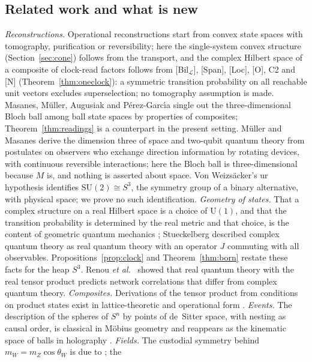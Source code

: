 \documentclass[aps,pra,onecolumn,superscriptaddress,nofootinbib,10pt]{revtex4-2}
\theoremstyle{definition}
\theoremstyle{remark}
\newcommand{\cL}{\mathcal{L}}
\newcommand{\SU}{\mathrm{SU}}
\newcommand{\U}{\mathrm{U}}
\begin{document}
\subsection{Related work and what is new}
\emph{Reconstructions.}  Operational reconstructions \cite{Hardy,CDP,MM,MMAP,DB} start from convex state
spaces with tomography, purification or reversibility; here the single-system convex structure
(Section~\ref{sec:cone}) follows from the transport, and the complex Hilbert space of a composite of clock-read factors follows from [Bil$_\cL$], [Span],
[Loc], [O], C2 and [N] (Theorem~\ref{thm:oneclock}): a symmetric transition probability on all reachable
unit vectors excludes superselection; no tomography assumption is made.  Masanes, M\"uller, Augusiak and P\'erez-Garc\'{\i}a \cite{MMAP,MMPA14} single out the
three-dimensional Bloch ball among ball state spaces by properties of composites;
Theorem~\ref{thm:readings} is a counterpart in the present setting.  M\"uller and Masanes \cite{MuM} derive the dimension three of
space and two-qubit quantum theory from postulates on observers who exchange direction information by
rotating devices, with continuous reversible interactions; here the Bloch ball is three-dimensional
because $M$ is, and nothing is asserted about space.  Von Weizs\"acker's ur hypothesis \cite{vW}
identifies $\SU(2)\cong S^3$, the symmetry group of a binary alternative, with physical space; we prove no
such identification.
\emph{Geometry of states.}  That a complex structure on a real Hilbert space is a choice of $\U(1)$, and that
the transition probability is determined by the real metric and that choice, is the content of geometric
quantum mechanics \cite{Mielnik68,Kibble79,AshtekarSchilling,BrodyHughston}; Stueckelberg \cite{Stueckelberg}
described complex quantum theory as real quantum theory with an operator $J$ commuting with all
observables.  Propositions~\ref{prop:clock} and Theorem~\ref{thm:born} restate these facts for the
heap $S^3$.  Renou \emph{et al.}\ \cite{Renou} showed that real quantum theory with the real tensor product
predicts network correlations that differ from complex quantum theory.
\emph{Composites.}  Derivations of the tensor product from conditions on product states exist in
lattice-theoretic and operational form \cite{AertsDaubechies,Matolcsi75,CMA21}.
\emph{Events.}  The description of the spheres of $S^n$ by points of de~Sitter space, with nesting as
causal order, is classical in M\"obius geometry \cite{HJ} and reappears as the kinematic space of balls in
holography \cite{CLMS15,dBHMN16,dBHHM16}.
\emph{Fields.}  The custodial symmetry behind $m_W=m_Z\cos\theta_W$ is due to \cite{Veltman77,SSVZ}; the
\end{document}
